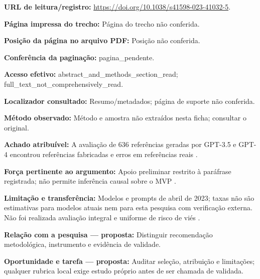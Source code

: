 \noindent\textbf{URL de leitura/registro:} \url{https://doi.org/10.1038/s41598-023-41032-5}.\par\medskip

\noindent\textbf{Página impressa do trecho:} Página do trecho não conferida.\par\medskip

\noindent\textbf{Posição da página no arquivo PDF:} Posição não conferida.\par\medskip

\noindent\textbf{Conferência da paginação:} pagina\_pendente.\par\medskip

\noindent\textbf{Acesso efetivo:} abstract\_and\_methods\_section\_read; full\_text\_not\_comprehensively\_read.\par\medskip

\noindent\textbf{Localizador consultado:} Resumo/metadados; página de suporte não conferida.\par\medskip

\noindent\textbf{Método observado:} Método e amostra não extraídos nesta ficha; consultar o original.\par\medskip

\noindent\textbf{Achado atribuível:} A avaliação de 636 referências geradas por GPT-3.5 e GPT-4 encontrou referências fabricadas e erros em referências reais \citep{SU06}.\par\medskip

\noindent\textbf{Força pertinente ao argumento:} Apoio preliminar restrito à paráfrase registrada; não permite inferência causal sobre o MVP \citep{SU06}.\par\medskip

\noindent\textbf{Limitação e transferência:} Modelos e prompts de abril de 2023; taxas não são estimativas para modelos atuais nem para esta pesquisa com verificação externa. Não foi realizada avaliação integral e uniforme de risco de viés \citep{SU06}.\par\medskip

\noindent\textbf{Relação com a pesquisa — proposta:} Distinguir recomendação metodológica, instrumento e evidência de validade.\par\medskip

\noindent\textbf{Oportunidade e tarefa — proposta:} Auditar seleção, atribuição e limitações; qualquer rubrica local exige estudo próprio antes de ser chamada de validada.\par\medskip

